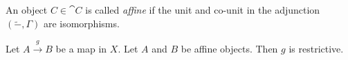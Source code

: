 

\begin{definition}
An object $C\in\cat{C}$ is called \emph{affine}
if the unit and co-unit in the adjunction $(\widetilde{-}, \Gamma{})$ are isomorphisms.
\end{definition}


Let $A\xrightarrow{g} B$ be a map in $X$. Let $A$ and $B$ be affine objects.
Then $g$ is restrictive.

